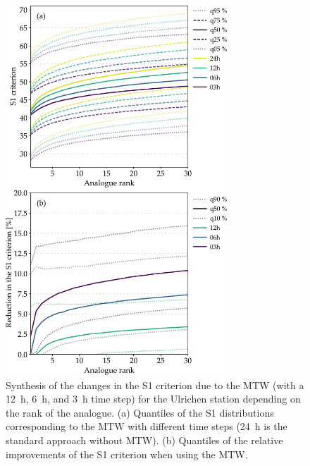 \documentclass[hess, manuscript]{copernicus}
\begin{document}
	\begin{figure}[htb]
		\begin{center}
			\includegraphics[width=8.3cm]{fig06.pdf}
		\end{center}
		\caption{Synthesis of the changes in the S1 criterion due to the MTW (with a 12~h, 6~h, and 3~h time step) for the Ulrichen station depending on the rank of the analogue. (a) Quantiles of the S1 distributions corresponding to the MTW with different time steps (24~h is the standard approach without MTW). (b) Quantiles of the relative improvements of the S1 criterion when using the MTW.}
		\label{fig:changes_S1}
	\end{figure}
	
\end{document}
